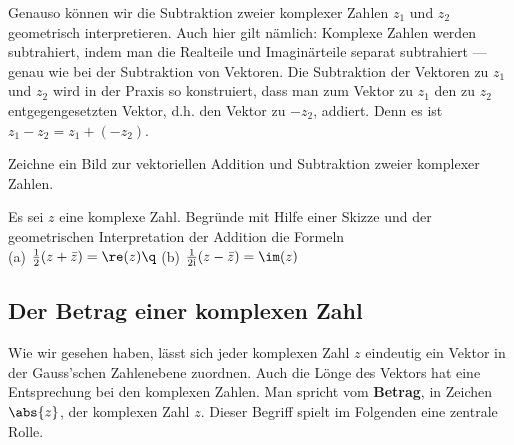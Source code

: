 \documentclass[%
11pt,%
twoside,%
titlepage,%
german,%
headsepline%
]{scrartcl}
\begin{document}
Genauso k\"onnen wir die Subtraktion zweier komplexer Zahlen $z_1$ und $z_2$ geometrisch interpretieren. Auch hier gilt nämlich: Komplexe Zahlen werden subtrahiert, indem man die Realteile und Imaginärteile separat subtrahiert --- genau wie bei der Subtraktion von Vektoren.
Die Subtraktion der Vektoren zu $z_1$ und $z_2$ wird in der Praxis so konstruiert, dass man zum Vektor zu $z_1$ den zu $z_2$ entgegengesetzten Vektor, d.h. den Vektor zu $-z_2$, addiert. Denn es ist $z_1 - z_2 = z_1 + (-z_2)$.

\begin{ueb}[Geometrie]
Zeichne ein Bild zur vektoriellen Addition und Subtraktion zweier komplexer Zahlen.
\end{ueb}

\begin{ueb}[S-Multiplikation]
Es sei $z$ eine komplexe Zahl. Begr\"unde mit Hilfe einer Skizze und der geometrischen Interpretation der Addition die Formeln\\[1ex]
(a) $\frac{1}{2}(z+\bar{z})=\re(z)\q$ (b) $\frac{1}{2\mathrm{i}}(z-\bar{z})=\im(z)$
\end{ueb}

\subsection{Der Betrag einer komplexen Zahl}

Wie wir gesehen haben, lässt sich jeder komplexen Zahl $z$ eindeutig ein Vektor in der Gauss'schen Zahlenebene zuordnen. Auch die L\"onge des Vektors hat eine Entsprechung bei den komplexen Zahlen. Man spricht vom \textbf{Betrag}, in Zeichen $\abs{z}$, der komplexen Zahl $z$. Dieser Begriff spielt im Folgenden eine zentrale Rolle.
\end{document}
